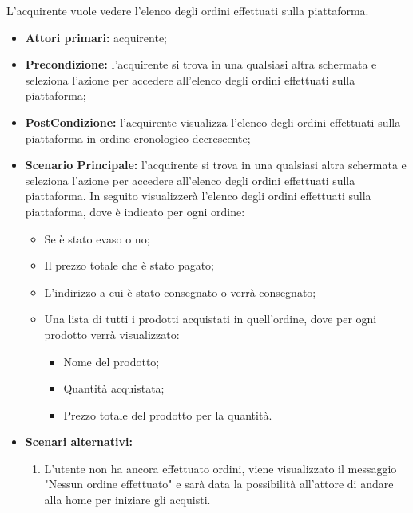 
L'acquirente vuole vedere l'elenco degli ordini effettuati sulla piattaforma.
\begin{itemize}
    \item \textbf{Attori primari:} acquirente;
    \item \textbf{Precondizione:} l'acquirente si trova in una qualsiasi altra schermata e seleziona l'azione per accedere all'elenco degli ordini effettuati sulla piattaforma;
    \item \textbf{PostCondizione:} l'acquirente visualizza l'elenco degli ordini effettuati sulla piattaforma in ordine cronologico decrescente;
    \item \textbf{Scenario Principale:} l'acquirente si trova in una qualsiasi altra schermata e seleziona l'azione per accedere all'elenco degli ordini effettuati sulla piattaforma. In seguito visualizzerà l'elenco degli ordini effettuati sulla piattaforma, dove è indicato per ogni ordine:
    \begin{itemize}
        \item Se è stato evaso o no;
        \item Il prezzo totale che è stato pagato;
        \item L'indirizzo a cui è stato consegnato o verrà consegnato;
        \item Una lista di tutti i prodotti acquistati in quell'ordine, dove per ogni prodotto verrà visualizzato:
        \begin{itemize}
            \item Nome del prodotto;
            \item Quantità acquistata;
            \item Prezzo totale del prodotto per la quantità.
        \end{itemize}
    \end{itemize}
    \item \textbf{Scenari alternativi:} 
    \begin{enumerate}[label=\lett]
        \item L'utente non ha ancora effettuato ordini, viene visualizzato il messaggio "Nessun ordine effettuato" e sarà data la possibilità all'attore di andare alla home per iniziare gli acquisti.
    \end{enumerate}
\end{itemize}

